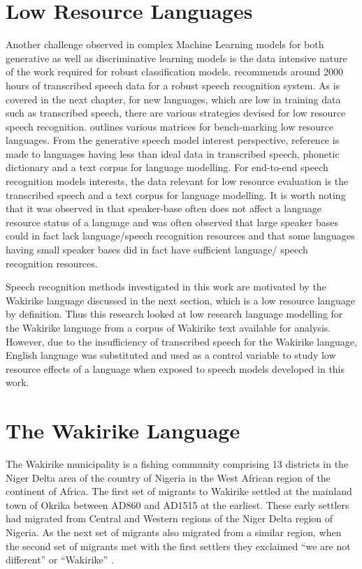 \section{Low Resource Languages}
Another challenge observed in complex Machine Learning models for both generative as well as discriminative learning models is the data intensive nature of the work required for robust classification models. \cite{saon2015ibm} recommends around 2000 hours of transcribed speech data for a robust speech recognition system. As is covered in the next chapter, for new languages, which are low in training data such as transcribed speech, there are various strategies devised for low resource speech recognition. \cite{besacier2014automatic} outlines various matrices for bench-marking low resource languages.  From the generative speech model interest perspective,  reference is made to languages having less than ideal data in transcribed speech, phonetic dictionary and a text corpus for language modelling.  For end-to-end speech recognition models interests, the data relevant for low resource evaluation is the transcribed speech and a text corpus for language modelling.  It is worth noting that it was observed in \cite{besacier2014automatic} that speaker-base often does not affect a language resource status of a language and was often observed that large speaker bases could in fact lack language/speech recognition resources and that some languages having small speaker bases did in fact have sufficient language/ speech recognition resources.

Speech recognition methods investigated in this work are motivated by the Wakirike language discussed in the next section, which is a low resource language by definition.  Thus this research looked at low research language modelling for the Wakirike language from a corpus of Wakirike text available for analysis.  However, due to the insufficiency of transcribed speech for the Wakirike language, English language was substituted and used as a control variable to study low resource effects of a language when exposed to speech models developed in this work.

\section{The Wakirike Language}
The Wakirike municipality is a fishing community comprising 13 districts in the Niger Delta area of the country of Nigeria in the West African region of the continent of Africa. The first set of migrants to Wakirike settled at the mainland town of Okrika between AD860 and AD1515 at the earliest.  These early settlers had migrated from Central and Western regions of the Niger Delta region of Nigeria.  As the next set of migrants also migrated from a similar region, when the second set of migrants met with the first settlers they exclaimed “we are not different” or “Wakirike” \citep{wakirike}.  

